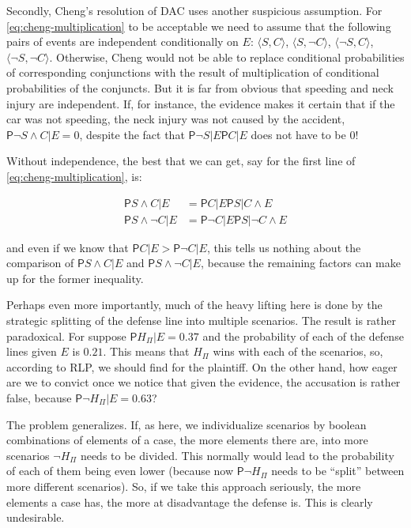 \documentclass[10pt,dvipsnames,enabledeprecatedfontcommands]{scrartcl}
\newcommand{\ra}{\rangle}
\newcommand{\la}{\langle}
\newcommand{\n}{\neg}
\newcommand{\et}{\wedge}
\newcommand{\pr}{\mathsf{P}}
\begin{document}
Secondly, Cheng's resolution of DAC uses another suspicious assumption.
For \eqref{eq:cheng-multiplication} to be acceptable we need to assume
that the following pairs of events are independent conditionally on
\(E\): \(\la S, C\ra\), \(\la S, \n C\ra\), \(\la \n S, C\ra\),
\(\la \n S, \n C\ra\). Otherwise, Cheng would not be able to replace
conditional probabilities of corresponding conjunctions with the result
of multiplication of conditional probabilities of the conjuncts. But it
is far from obvious that speeding and neck injury are independent. If,
for instance, the evidence makes it certain that if the car was not
speeding, the neck injury was not caused by the accident,
\(\pr{\n S\et C\vert E}=0\), despite the fact that
\(\pr{\n S \vert E}\pr{C\vert E}\) does not have to be \(0\)!

Without independence, the best that we can get, say for the first line
of \eqref{eq:cheng-multiplication}, is:

\begin{align*}
\pr{S\et C\vert E} & = \pr{C\vert E}\pr{S\vert C \et E}\\
\pr{S\et \n C\vert E} & = \pr{\n C\vert E}\pr{S\vert  \n C \et E}
\end{align*}

and even if we know that \(\pr{C\vert E}>\pr{\n C\vert E}\), this tells
us nothing about the comparison of \(\pr{S\et C\vert E}\) and
\(\pr{S\et \n C\vert E}\), because the remaining factors can make up for
the former inequality.

Perhaps even more importantly, much of the heavy lifting here is done by
the strategic splitting of the defense line into multiple scenarios. The
result is rather paradoxical. For suppose \(\pr{H_\Pi\vert E}=0.37\) and
the probability of each of the defense lines given \(E\) is \(0.21\).
This means that \(H_\Pi\) wins with each of the scenarios, so, according
to RLP, we should find for the plaintiff. On the other hand, how eager
are we to convict once we notice that given the evidence, the accusation
is rather false, because \(\pr{\n H_\Pi\vert E}=0.63\)?

The problem generalizes. If, as here, we individualize scenarios by
boolean combinations of elements of a case, the more elements there are,
into more scenarios \(\n H_\Pi\) needs to be divided. This normally
would lead to the probability of each of them being even lower (because
now \(\pr{\n H_\Pi}\) needs to be ``split'' between more different
scenarios). So, if we take this approach seriously, the more elements a
case has, the more at disadvantage the defense is. This is clearly
undesirable.
\end{document}
